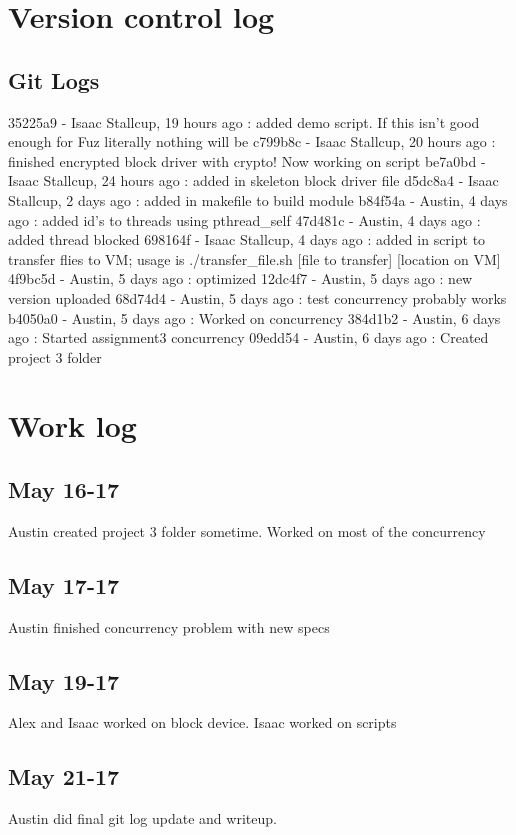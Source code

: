 \documentclass[letterpaper,10pt,titlepage]{article}
\begin{document}
\section{Version control log}
\subsection{Git Logs}
35225a9 - Isaac Stallcup, 19 hours ago : added demo script. If this isn't good enough for Fuz literally nothing will be
c799b8c - Isaac Stallcup, 20 hours ago : finished encrypted block driver with crypto! Now working on script
be7a0bd - Isaac Stallcup, 24 hours ago : added in skeleton block driver file
d5dc8a4 - Isaac Stallcup, 2 days ago : added in makefile to build module
b84f54a - Austin, 4 days ago : added id's to threads using pthread\_self
47d481c - Austin, 4 days ago : added thread blocked
698164f - Isaac Stallcup, 4 days ago : added in script to transfer flies to VM; usage is ./transfer\_file.sh [file to transfer] [location on VM]
4f9bc5d - Austin, 5 days ago : optimized
12dc4f7 - Austin, 5 days ago : new version uploaded
68d74d4 - Austin, 5 days ago : test concurrency probably works
b4050a0 - Austin, 5 days ago : Worked on concurrency
384d1b2 - Austin, 6 days ago : Started assignment3 concurrency
09edd54 - Austin, 6 days ago : Created project 3 folder
\section{Work log}

\subsection{May 16-17}
Austin created project 3 folder sometime.  Worked on most of the concurrency
\subsection{May 17-17}
Austin finished concurrency problem with new specs
\subsection{May 19-17}
Alex and Isaac worked on block device. Isaac worked on scripts
\subsection{May 21-17}
Austin did final git log update and writeup.


%
%
\end{document}
